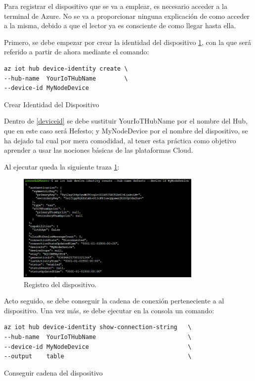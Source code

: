 \documentclass[english,runningheads,a4paper]{llncs}[2018/03/10]
\begin{document}
Para registrar el dispositivo que se va a emplear, es necesario acceder a la
terminal de Azure. No se va a proporcionar ninguna explicación de como acceder a
la misma, debido a que el lector ya es consciente de como llegar hasta ella.

Primero, se debe empezar por crear la identidad del dispositivo 
\hyperref[register]{\ref{register}}, con la que será referido a partir de ahora 
mediante el comando:

\begin{listing}[htp]
\centering
    \begin{verbatim}
az iot hub device-identity create \
--hub-name  YourIoTHubName        \
--device-id MyNodeDevice
    \end{verbatim}
\caption{Crear Identidad del Dispositivo}
\label{deviceid}
\end{listing}

Dentro de \hyperref[deviceid]{\ref{deviceid}} se debe sustituir YourIoTHubName
por el nombre del Hub, que en este caso será Hefesto; y MyNodeDevice por el
nombre del dispositivo, se ha dejado tal cual por mera comodidad, al tener esta
práctica como objetivo aprender a usar las nociones básicas de las plataformas
Cloud.

Al ejecutar queda la siguiente traza \hyperref[register]{\ref{register}}:

\begin{figure}[h!]
 \centering
 \includegraphics[width=0.8\textwidth]{./IoT/MicrosoftAzure/3-1_register_device.png}
 \caption{Registro del dispositivo.}
 \label{register}
\end{figure}

Acto seguido, se debe conseguir la cadena de conexión perteneciente a al
dispositivo. Una vez más, se debe ejecutar en la consola un comando:

\begin{listing}[htp]
\centering
    \begin{verbatim}
az iot hub device-identity show-connection-string   \
--hub-name  YourIoTHubName                          \
--device-id MyNodeDevice                            \
--output    table                                   \
    \end{verbatim}
\caption{Conseguir cadena del dispositivo}
\label{condevcommand}
\end{listing}
\end{document}
